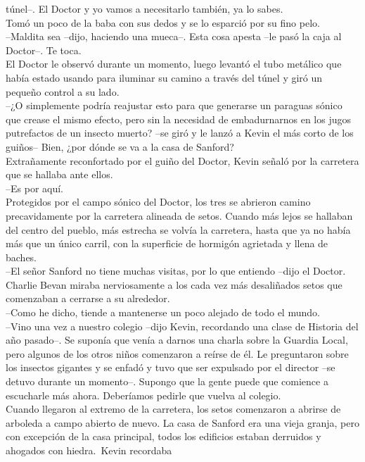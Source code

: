 túnel--. El Doctor y yo vamos a necesitarlo también, ya lo sabes.\\
Tomó un poco de la baba con sus dedos y se lo esparció por su fino
pelo.\\
--Maldita sea --dijo, haciendo una mueca--. Esta cosa apesta --le pasó
la caja al Doctor--. Te toca.\\
El Doctor le observó durante un momento, luego levantó el tubo metálico
que había estado usando para iluminar su camino a través del túnel y
giró un pequeño control a su lado.\\
--¿O simplemente podría reajustar esto para que generarse un paraguas
sónico que crease el mismo efecto, pero sin la necesidad de
embadurnarnos en los jugos putrefactos de un insecto muerto? --se giró y
le lanzó a Kevin el más corto de los guiños-- Bien, ¿por dónde se va a
la casa de Sanford?\\
Extrañamente reconfortado por el guiño del Doctor, Kevin señaló por la
carretera que se hallaba ante ellos.\\
--Es por aquí.\\
Protegidos por el campo sónico del Doctor, los tres se abrieron camino
precavidamente por la carretera alineada de setos. Cuando más lejos se
hallaban del centro del pueblo, más estrecha se volvía la carretera,
hasta que ya no había más que un único carril, con la superficie de
hormigón agrietada y llena de baches.\\
--El señor Sanford no tiene muchas visitas, por lo que entiendo --dijo
el Doctor.\\
Charlie Bevan miraba nerviosamente a los cada vez más desaliñados setos
que comenzaban a cerrarse a su alrededor.\\
--Como he dicho, tiende a mantenerse un poco alejado de todo el mundo.\\
--Vino una vez a nuestro colegio --dijo Kevin, recordando una clase de
Historia del año pasado--. Se suponía que venía a darnos una charla
sobre la Guardia Local, pero algunos de los otros niños comenzaron a
reírse de él. Le preguntaron sobre los insectos gigantes y se enfadó y
tuvo que ser expulsado por el director --se detuvo durante un momento--.
Supongo que la gente puede que comience a escucharle más ahora.
Deberíamos pedirle que vuelva al colegio.\\
Cuando llegaron al extremo de la carretera, los setos comenzaron a
abrirse de arboleda a campo abierto de nuevo. La casa de Sanford era una
vieja granja, pero con excepción de la casa principal, todos los
edificios estaban derruidos y ahogados con hiedra.~Kevin recordaba
